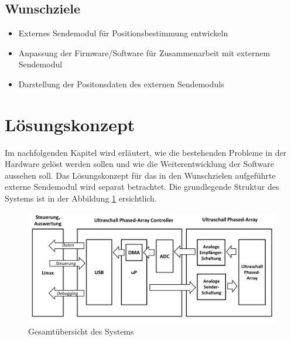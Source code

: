 \documentclass[10pt,a4paper,oneside]{99_fhnwreport}
\begin{document}
\subsection*{Wunschziele}
\begin{itemize}
	\item Externes Sendemodul für Positionsbestimmung entwickeln
	\item Anpassung der Firmware/Software für Zusammenarbeit mit externem Sendemodul
	\item Darstellung der Positonsdaten des externen Sendemoduls
\end{itemize}

\clearpage

\section{Lösungskonzept}\label{sec:loesungskonzept}
Im nachfolgenden Kapitel wird erläutert, wie die bestehenden Probleme in der Hardware gelöst werden sollen und wie die Weiterentwicklung der Software aussehen soll. Das Lösungskonzept für das in den Wunschzielen aufgeführte externe Sendemodul wird separat betrachtet. Die grundlegende Struktur des Systems ist in der Abbildung \ref{fig:image_schema} ersichtlich.

\begin{figure}[htb]
\includegraphics[width=\textwidth,angle=0]{graphics/image_schema.png}
\caption{Gesamtübersicht des Systems} %
\label{fig:image_schema}
\end{figure}
%

\end{document}
